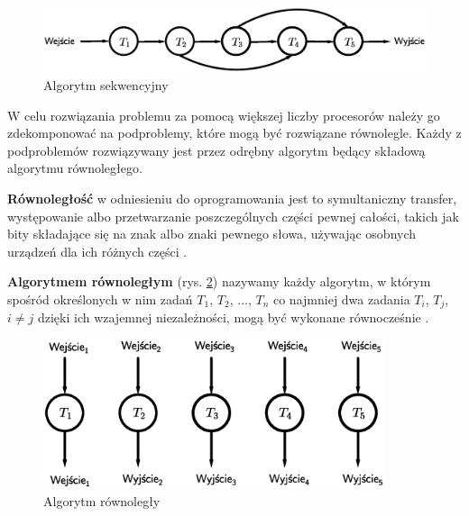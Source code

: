 \begin{figure}[h]
\centering
\includegraphics[width=14cm]{images/Rys2.eps}
\caption{Algorytm sekwencyjny}
\label{fig:sequential}
\end{figure}

W celu rozwiązania problemu za pomocą większej liczby procesorów należy go zdekomponować na podproblemy, które mogą być rozwiązane równolegle. Każdy z podproblemów rozwiązywany jest przez odrębny algorytm będący składową algorytmu równoległego.


\begin{definicja}[Równoległość]\label{def:rownoleglosc}
\textbf{Równoległość} w odniesieniu do oprogramowania jest to symultaniczny transfer, występowanie albo przetwarzanie poszczególnych części pewnej całości, takich jak bity składające się na znak albo znaki pewnego słowa, używając osobnych urządzeń dla ich różnych części \cite{IEEE}.
\end{definicja}


\begin{definicja}\label{def:algorytm_rownolegly}
\textbf{Algorytmem równoległym} (rys. \ref{fig:parallel}) nazywamy każdy algorytm, w którym spośród określonych w nim zadań \(T_1\), \(T_2\), \(\dots\), \(T_n\) co najmniej dwa zadania \(T_i\), \(T_j\), \(i\neq j\) dzięki ich wzajemnej niezależności, mogą być wykonane równocześnie \cite{APC2011}.\\
\end{definicja}

\begin{figure}[h]
\centering
\includegraphics[width=10cm]{images/Rys1.eps}
\caption{Algorytm równoległy}
\label{fig:parallel}
\end{figure}



%
%
%
%
